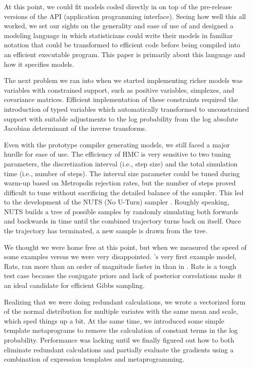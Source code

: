 \documentclass[article]{jss}
\begin{document}
At this point, we could fit models coded directly in  on
top of the pre-release versions of the  API
(application programming interface).  Seeing how well this all worked,
we set our sights on the generality and ease of use of
 and designed a modeling language in which
statisticians could write their models in familiar notation that could
be transformed to efficient  code before being compiled into
an efficient executable program.  This paper is primarily about this
language and how it specifies models.
 
The next problem we ran into when we started implementing richer
models was variables with constrained support, such as positive variables, 
simplexes, and covariance matrices.  
Efficient implementation of these constraints
required the introduction of typed variables which automatically transformed to
unconstrained support with suitable adjustments to the log probability
from the log absolute Jacobian determinant of the inverse transforms.

Even with the prototype compiler generating models, we still faced a
major hurdle for ease of use. The efficiency of HMC is very sensitive
to two tuning parameters, the discretization interval (i.e., step
size) and the total simulation time (i.e., number of steps).  The interval
size parameter could be tuned during warm-up based on Metropolis
rejection rates, but the number of steps proved difficult to tune without
sacrificing the detailed balance of the sampler.  This led to the
development of the NUTS (No U-Turn) sampler
\citep{HoffmanGelman:2011}.  Roughly speaking, NUTS builds a tree
of possible samples by randomly simulating both forwards and backwards
in time until the combined trajectory turns back on itself.  Once the trajectory
has terminated, a new sample is drawn from the tree.

We thought we were home free at this point, but when we measured the
speed of some  examples versus  we were
very disappointed.  's very first example model, Rats,
ran more than an order of magnitude faster in  than in
.  Rats is a tough test case because the conjugate
priors and lack of posterior correlations make it an ideal candidate
for efficient Gibbs sampling.  

Realizing that we were doing redundant calculations, we wrote a
vectorized form of the normal distribution for multiple variates with
the same mean and scale, which sped things up a bit. At the same time,
we introduced some simple template metaprograms to remove the
calculation of constant terms in the log probability.  Performance was
lacking until we finally figured out how to both eliminate redundant 
calculations and partially evaluate the gradients using
a combination of expression templates and metaprogramming. 
\end{document}
